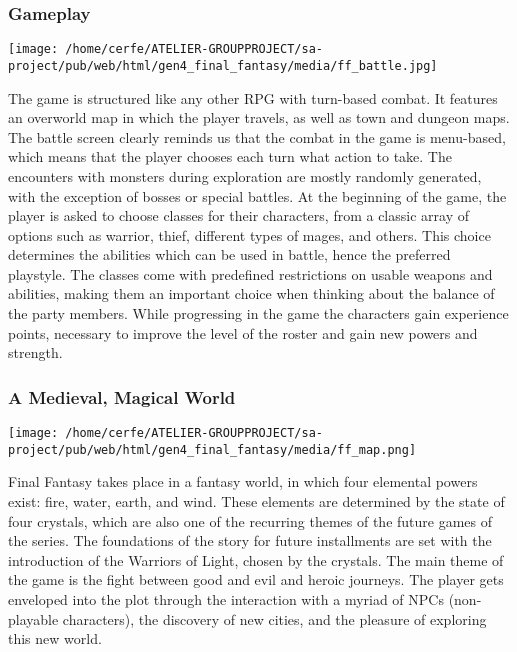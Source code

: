 \documentclass[a4paper,10pt]{book}
\begin{document}
 
 \subsubsection{Gameplay }
 \texttt{[image: /home/cerfe/ATELIER-GROUPPROJECT/sa-project/pub/web/html/gen4\_final\_fantasy/media/ff\_battle.jpg]}
 
          The game is structured like any other RPG with turn-based combat. It
          features an overworld map in which the player travels, as well as town
          and dungeon maps. The battle screen clearly reminds us that the combat
          in the game is menu-based, which means that the player chooses each turn
          what action to take. The encounters with monsters during exploration are
          mostly randomly generated, with the exception of bosses or special battles.
          At the beginning of the game, the player is asked to choose classes for
          their characters, from a classic array of options such as warrior, thief,
          different types of mages, and others. This choice determines the abilities
          which can be used in battle, hence the preferred playstyle. The classes
          come with predefined restrictions on usable weapons and abilities,
          making them an important choice when thinking about the balance of the party
          members. While progressing in the game the characters gain experience points,
          necessary to improve the level of the roster and gain new powers and strength.
         
 
 \subsubsection{A Medieval, Magical World }
 \texttt{[image: /home/cerfe/ATELIER-GROUPPROJECT/sa-project/pub/web/html/gen4\_final\_fantasy/media/ff\_map.png]}
 
          Final Fantasy takes place in a fantasy world, in which four elemental
          powers exist: fire, water, earth, and wind. These elements are determined
          by the state of four crystals, which are also one of the recurring themes
          of the future games of the series. The foundations of the story for future
          installments are set with the introduction of the Warriors of Light,
          chosen by the crystals. The main theme of the game is the fight between
          good and evil and heroic journeys. The player gets enveloped into the
          plot through the interaction with a myriad of NPCs (non-playable characters),
          the discovery of new cities, and the pleasure of exploring this new world.
         
\end{document}
